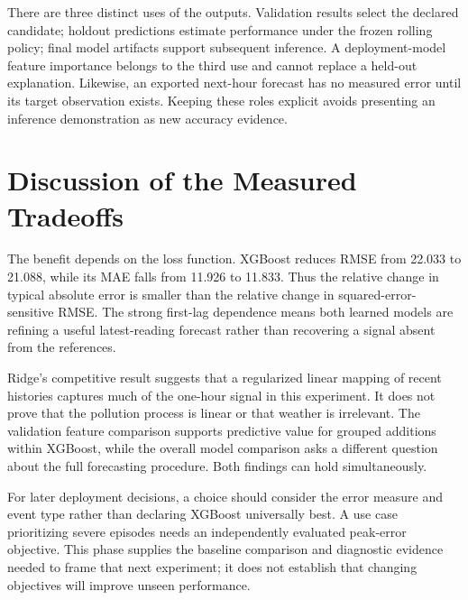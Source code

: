 \documentclass[conference]{IEEEtran}
\begin{document}
There are three distinct uses of the outputs. Validation results select the declared candidate; holdout predictions estimate performance under the frozen rolling policy; final model artifacts support subsequent inference. A deployment-model feature importance belongs to the third use and cannot replace a held-out explanation. Likewise, an exported next-hour forecast has no measured error until its target observation exists. Keeping these roles explicit avoids presenting an inference demonstration as new accuracy evidence.

\section{Discussion of the Measured Tradeoffs}
The benefit depends on the loss function. XGBoost reduces RMSE from 22.033 to 21.088, while its MAE falls from 11.926 to 11.833. Thus the relative change in typical absolute error is smaller than the relative change in squared-error-sensitive RMSE. The strong first-lag dependence means both learned models are refining a useful latest-reading forecast rather than recovering a signal absent from the references.

Ridge's competitive result suggests that a regularized linear mapping of recent histories captures much of the one-hour signal in this experiment. It does not prove that the pollution process is linear or that weather is irrelevant. The validation feature comparison supports predictive value for grouped additions within XGBoost, while the overall model comparison asks a different question about the full forecasting procedure. Both findings can hold simultaneously.

For later deployment decisions, a choice should consider the error measure and event type rather than declaring XGBoost universally best. A use case prioritizing severe episodes needs an independently evaluated peak-error objective. This phase supplies the baseline comparison and diagnostic evidence needed to frame that next experiment; it does not establish that changing objectives will improve unseen performance.
\end{document}
